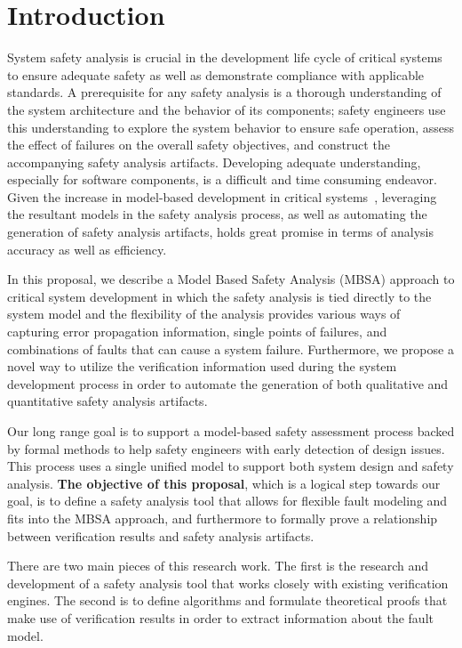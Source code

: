 \chapter{Introduction}
\label{chap:intro}

System safety analysis is crucial in the development life cycle of critical systems to ensure adequate safety as well as demonstrate compliance with applicable standards. A prerequisite for any safety analysis is a thorough understanding of the system architecture and the behavior of its components; safety engineers use this understanding to explore the system behavior to ensure safe operation, assess the effect of failures on the overall safety objectives, and construct the accompanying safety analysis artifacts. Developing adequate understanding, especially for software components, is a difficult and time consuming endeavor. Given the increase in model-based development in critical systems~\cite{Joshi05:Dasc,CAV2015:BoCiGrMa,info17:HaLuHo,5979344,Gudemann:2010:FQQ:1909626.1909813}, leveraging the resultant models in the safety analysis process, as well as automating the generation of safety analysis artifacts, holds great promise in terms of analysis accuracy as well as efficiency.

In this proposal, we describe a Model Based Safety Analysis (MBSA) approach to critical system development in which the safety analysis is tied directly to the system model and the flexibility of the analysis provides various ways of capturing error propagation information, single points of failures, and combinations of faults that can cause a system failure. Furthermore, we propose a novel way to utilize the verification information used during the system development process in order to automate the generation of both qualitative and quantitative safety analysis artifacts. 

Our long range goal is to support a model-based safety assessment process backed by formal methods to help safety engineers with early detection of design issues. This process uses a single unified model to support both system design and safety analysis. \textbf{The objective of this proposal}, which is a logical step towards our goal, is to define a safety analysis tool that allows for flexible fault modeling and fits into the MBSA approach, and furthermore to formally prove a relationship between verification results and safety analysis artifacts.

There are two main pieces of this research work. The first is the research and development of a safety analysis tool that works closely with existing verification engines. The second is to define algorithms and formulate theoretical proofs that make use of verification results in order to extract information about the fault model.  

